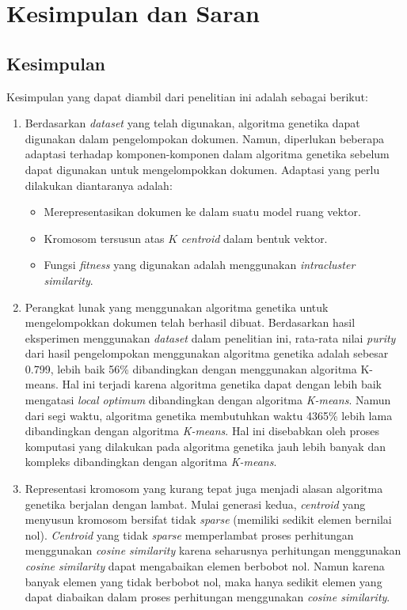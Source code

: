 \chapter{Kesimpulan dan Saran}
\label{chap:kesimpulan}

\section{Kesimpulan}
Kesimpulan yang dapat diambil dari penelitian ini adalah sebagai berikut:

\begin{enumerate}
	\item Berdasarkan \textit{dataset} yang telah digunakan, algoritma genetika dapat digunakan dalam pengelompokan dokumen. Namun, diperlukan beberapa adaptasi terhadap komponen-komponen dalam algoritma genetika sebelum dapat digunakan untuk mengelompokkan dokumen. Adaptasi yang perlu dilakukan diantaranya adalah:
	\begin{itemize}
		\item Merepresentasikan dokumen ke dalam suatu model ruang vektor.
		\item Kromosom tersusun atas $K$ \textit{centroid} dalam bentuk vektor.
		\item Fungsi \textit{fitness} yang digunakan adalah menggunakan \textit{intracluster similarity}.
	\end{itemize}
	\item Perangkat lunak yang menggunakan algoritma genetika untuk mengelompokkan dokumen telah berhasil dibuat. Berdasarkan hasil eksperimen menggunakan \textit{dataset} dalam penelitian ini, rata-rata nilai \textit{purity} dari hasil pengelompokan menggunakan algoritma genetika adalah sebesar 0.799, lebih baik 56\% dibandingkan dengan menggunakan algoritma K-means. Hal ini terjadi karena algoritma genetika dapat dengan lebih baik mengatasi \textit{local optimum} dibandingkan dengan algoritma \textit{K-means}. Namun dari segi waktu, algoritma genetika membutuhkan waktu 4365\% lebih lama dibandingkan dengan algoritma \textit{K-means}. Hal ini disebabkan oleh proses komputasi yang dilakukan pada algoritma genetika jauh lebih banyak dan kompleks dibandingkan dengan algoritma \textit{K-means}.
	\item Representasi kromosom yang kurang tepat juga menjadi alasan algoritma genetika berjalan dengan lambat. Mulai generasi kedua, \textit{centroid} yang menyusun kromosom bersifat tidak \textit{sparse} (memiliki sedikit elemen bernilai nol). \textit{Centroid} yang tidak \textit{sparse} memperlambat proses perhitungan menggunakan \textit{cosine similarity} karena seharusnya perhitungan menggunakan \textit{cosine similarity} dapat mengabaikan elemen berbobot nol. Namun karena banyak elemen yang tidak berbobot nol, maka hanya sedikit elemen yang dapat diabaikan dalam proses perhitungan menggunakan \textit{cosine similarity}.

\end{enumerate}
